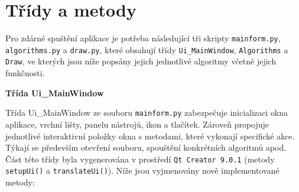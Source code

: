 \section*{Třídy a metody}
\par Pro zdárné spuštění aplikace je potřeba následující tři skripty \verb|mainform.py|, \verb|algorithms.py| a \verb|draw.py|, které obsahují třídy \verb|Ui_MainWindow|, \verb|Algorithms| a \verb|Draw|, ve kterých jsou níže popsány jejich jednotlivé algoritmy včetně jejich funkčnosti. 

\par {\large\textbf{Třída Ui\_MainWindow} }

\par Třída Ui\_MainWindow ze souboru \verb|mainform.py| zabezpečuje inicializaci okna aplikace, vrchní lišty, panelu nástrojů, ikon a tlačítek. Zároveň propojuje jednotlivé interaktivní položky okna s metodami, které vykonají specifické akce. Týkají se především otevření souboru, spouštění konkrétních algoritmů apod. Část této třídy byla vygenerována v prostředí \verb|Qt Creator 9.0.1| (metody \verb|setupUi()| a \verb|translateUi()|). Níže jsou vyjmenovány nově implementované metody:

